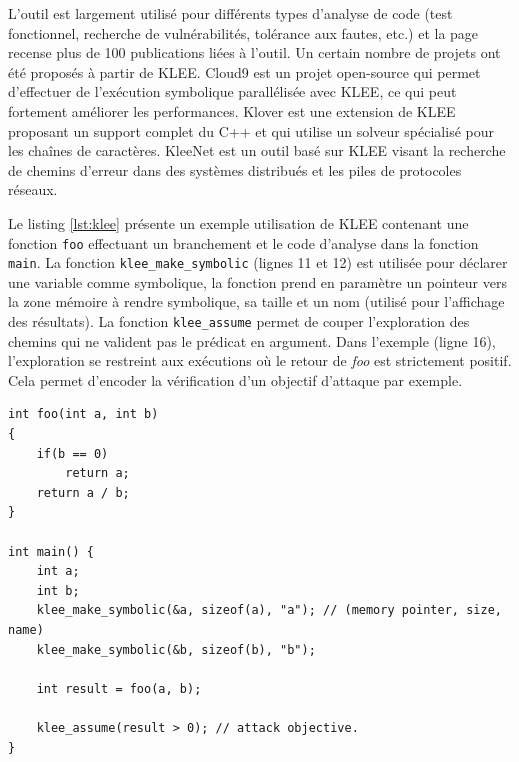             L'outil est largement utilisé pour différents types d'analyse de code (test fonctionnel, recherche de vulnérabilités, tolérance aux fautes, etc.) et la page \cite{klee-ref} recense plus de 100 publications liées à l'outil.
            Un certain nombre de projets ont été proposés à partir de KLEE.
            Cloud9 \cite{bucur2011parallel} est un projet open-source qui permet d'effectuer de l'exécution symbolique parallélisée avec KLEE, ce qui peut fortement améliorer les performances.
            Klover \cite{li2011klover} est une extension de KLEE proposant un support complet du C++ et qui utilise un solveur spécialisé pour les chaînes de caractères. 
            KleeNet \cite{sasnauskas2010kleenet} est un outil basé sur KLEE visant la recherche de chemins d'erreur dans des systèmes distribués et les piles de protocoles réseaux.
               
            \begin{sloppypar}  
            Le listing \ref{lst:klee} présente un exemple utilisation de KLEE contenant une fonction \texttt{foo} effectuant un branchement et le code d'analyse dans la fonction \texttt{main}.
            La fonction \texttt{klee\_make\_symbolic} (lignes 11 et 12) est utilisée pour déclarer une variable comme symbolique, la fonction prend en paramètre un pointeur vers la zone mémoire à rendre symbolique, sa taille et un nom (utilisé pour l'affichage des résultats).
            La fonction \texttt{klee\_assume} permet de couper l'exploration des chemins qui ne valident pas le prédicat en argument. Dans l'exemple (ligne 16), l'exploration se restreint aux exécutions où le retour de \textit{foo} est strictement positif. Cela permet d'encoder la vérification d'un objectif d'attaque par exemple.
            \end{sloppypar}  
            
            \begin{minipage}{\linewidth}
            \lstset{basicstyle=\large}
            \lstset{language=C,style=codeC}    
            \begin{lstlisting}[caption=Exemple d'instrumentation du programme pour KLEE, label=lst:klee]
int foo(int a, int b)
{
    if(b == 0)
        return a;
    return a / b;
}

int main() {
    int a;
    int b;
    klee_make_symbolic(&a, sizeof(a), "a"); // (memory pointer, size, name)
    klee_make_symbolic(&b, sizeof(b), "b");
    
    int result = foo(a, b);
    
    klee_assume(result > 0); // attack objective.
}
            \end{lstlisting}
            \end{minipage}
                
